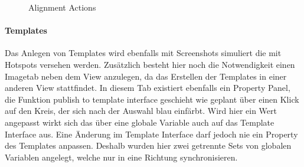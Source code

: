 \begin{figure}%
\centering
{}%
\qquad
{}%

\caption{Alignment Actions}%
\label{fig:Prototyp_06}
\end{figure}

\paragraph{Templates}
Das Anlegen von Templates wird ebenfalls mit Screenshots simuliert die mit Hotspots versehen werden.
Zusätzlich besteht hier noch die Notwendigkeit einen Imagetab neben dem View anzulegen, da das Erstellen der Templates in einer anderen View stattfindet.
In diesem Tab existiert ebenfalls ein Property Panel, die Funktion \glqq publish to template interface\grqq{} geschieht wie geplant über einen Klick auf den Kreis, der sich nach der Auswahl blau einfärbt.
Wird hier ein Wert angepasst wirkt sich das über eine globale Variable auch auf das Template Interface aus.
Eine Änderung im Template Interface darf jedoch nie ein Property des Templates anpassen.
Deshalb wurden hier zwei getrennte Sets von globalen Variablen angelegt, welche nur in eine Richtung synchronisieren.

